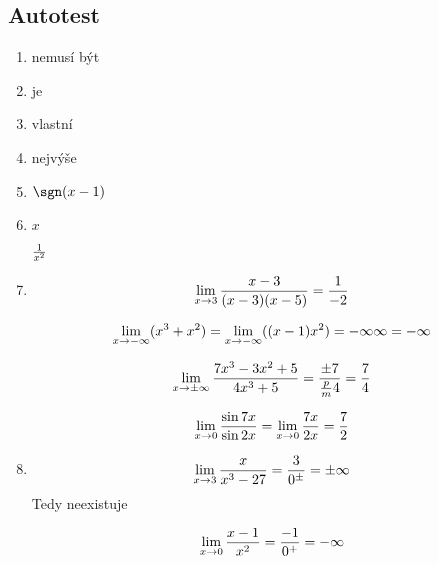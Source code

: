 
\BeginDoc{}
\def\posloup{$\zs{a_n}_{n=1}^{\infty}$}
\def\pos#1{\zs{#1}_{n=1}^{\infty}}
\def\li{\lim_{n\rightarrow\infty}}
\def\lix{\lim_{x\rightarrow x_0}}
\def\r{\rightarrow}
\def\sup{{\rm sup\ }}
\def\sciwinfup{{\rm inf\ }}
\def\su{\sum_{n=1}^{\infty}}


\subsection{Autotest}
\begin{enumerate}
	\item nemusí být
	\item je
	\item vlastní
	\item nejvýše
	\item $\sgn(x-1)$
	\item $x$

		$\frac 1 {x^2}$
	\item 
		$$
		\lim_{x\r 3} \f{x-3}{(x-3)(x-5)} = \f 1{-2}
		$$

		$$
		\lim_{x\r -\infty} (x^3+x^2)
		=
		\lim_{x\r -\infty} ((x-1)x^2)
		= -\infty \* \infty = -\infty
		$$

		$$
		\lim_{x\r \pm\infty} \f{7x^3-3x^2+5}{4x^3+5}
		=
		\f{\pm 7}{\f pm 4} = \f74
		$$

		$$
		\lim_{x\r 0} \f{\sin 7x}{\sin 2x}
		=
		\lim_{x\r 0} \f{7x}{2x}
		=
		 \f{7}{2}
		 $$

	 \item 
		 $$
		\lim_{x\r 3} \f{x}{x^3-27} = \f3{0^\pm} = \pm \infty
		$$ Tedy neexistuje


		$$
		\lim_{x\r 0} \f{x-1}{x^2} = \f{-1}{0^+} = -\infty
		$$
\end{enumerate}




\EndDoc
